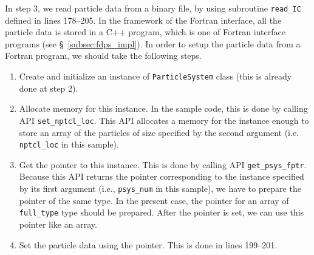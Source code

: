 \documentclass[twocolumn,useamsfonts]{pasj01}
\begin{document}
In step 3, we read particle data from a binary file, by using subroutine \texttt{read\_IC} defined in lines 178--205. In the framework of the Fortran interface, all the particle data is stored in a C++ program, which is one of Fortran interface programs (see \S~\ref{subsec:fdps_impl}). In order to setup the particle data from a Fortran program, we should take the following steps.
\begin{enumerate}[label=(\roman*)]
\item Create and initialize an instance of \texttt{ParticleSystem} class (this is already done at step 2).
\item Allocate memory for this instance. In the sample code, this is done by calling API \texttt{set\_nptcl\_loc}. This API allocates a memory for the instance enough to store an array of the particles of size specified by the second argument (i.e. \texttt{nptcl\_loc} in this sample).
\item Get the pointer to this instance. This is done by calling API \texttt{get\_psys\_fptr}. Because this API returns the pointer corresponding to the instance specified by its first argument (i.e., \texttt{psys\_num} in this sample), we have to prepare the pointer of the same type. In the present case, the pointer for an array of \texttt{full\_type} type should be prepared. After the pointer is set, we can use this pointer like an array.
\item Set the particle data using the pointer. This is done in lines 199--201.
\end{enumerate}
\end{document}

